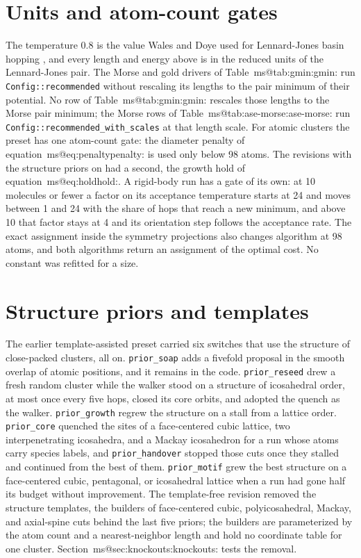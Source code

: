 \documentclass[journal=jctcce,manuscript=suppinfo]{achemso}
\makeatletter
\newcommand{\msref}[1]{\csname ms@#1\endcsname\mseqmark#1:\relax}
\def\mseqmark#1#2#3\relax{\ifx#1e\ifx#2q\ of the main text\fi\fi}
\makeatother
\begin{document}
\section{Units and atom-count gates}
\label{sec:units}
The temperature \(0.8\) is the value Wales and Doye used for Lennard-Jones
basin hopping \cite{wales1997}, and every length and energy above is in the
reduced units of the Lennard-Jones pair.
The Morse and gold drivers of Table~\msref{tab:gmin} run
\texttt{Config::recommended} without rescaling its lengths to the pair
minimum of their potential.
No row of Table~\msref{tab:gmin} rescales those lengths to the Morse pair
minimum; the Morse rows of Table~\msref{tab:ase-morse} run
\texttt{Config::recommended\_with\_scales} at that length scale.
For atomic clusters the preset has one atom-count gate: the diameter penalty
of equation~\msref{eq:penalty} is used only below 98 atoms.
The revisions with the structure priors on had a second, the growth hold of
equation~\msref{eq:hold}.
A rigid-body run has a gate of its own: at 10 molecules or fewer a factor on
its acceptance temperature starts at 24 and moves between 1 and 24 with the
share of hops that reach a new minimum, and above 10 that factor stays at 4
and its orientation step follows the acceptance rate.
The exact assignment inside the symmetry projections also changes algorithm
at 98 atoms, and both algorithms return an assignment of the optimal cost.
No constant was refitted for a size.

\section{Structure priors and templates}
\label{sec:priors}
The earlier template-assisted preset carried six switches that use the
structure of close-packed clusters, all on.
\texttt{prior\_soap} adds a fivefold proposal in the smooth overlap of atomic
positions, and it remains in the code.
\texttt{prior\_reseed} drew a fresh random cluster while the walker stood on
a structure of icosahedral order, at most once every five hops, closed its
core orbits, and adopted the quench as the walker.
\texttt{prior\_growth} regrew the structure on a stall from a lattice order.
\texttt{prior\_core} quenched the sites of a face-centered cubic lattice, two
interpenetrating icosahedra, and a Mackay icosahedron for a run whose atoms
carry species labels, and \texttt{prior\_handover} stopped those cuts once
they stalled and continued from the best of them.
\texttt{prior\_motif} grew the best structure on a face-centered cubic,
pentagonal, or icosahedral lattice when a run had gone half its budget without
improvement.
The template-free revision removed the structure templates, the builders of
face-centered cubic, polyicosahedral, Mackay, and axial-spine cuts behind the
last five priors; the builders are parameterized by the atom count and a
nearest-neighbor length and hold no coordinate table for one cluster.
Section~\msref{sec:knockouts} tests the removal.
\end{document}
